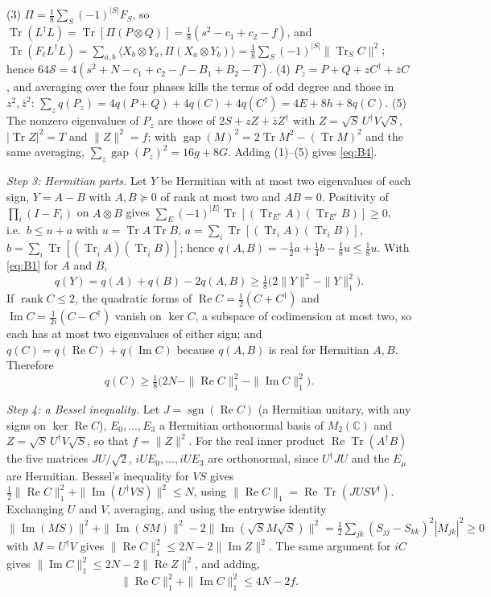 \documentclass[aps,pra,twocolumn,superscriptaddress,nofootinbib,longbibliography]{revtex4-2}
\newcommand{\C}{\mathbb C}
\newcommand{\ip}[2]{\langle #1,#2\rangle}
\DeclareMathOperator{\Tr}{Tr}
\DeclareMathOperator{\rank}{rank}
\theoremstyle{plain}
\theoremstyle{definition}
\theoremstyle{remark}
\begin{document}
(3) $\Pi=\tfrac18\sum_S(-1)^{|S|}F_S$, so $\Tr(L^\dagger L)=\Tr[\Pi(P\otimes Q)]=\tfrac18(s^2-c_1+c_2-f)$, and $\Tr(F_\ell L^\dagger L)=\sum_{a,b}\ip{X_b\otimes Y_a}{\Pi(X_a\otimes Y_b)}=\tfrac18\sum_S(-1)^{|S|}\|\Tr_SC\|^2$; hence $64\mathcal S=4(s^2+N-c_1+c_2-f-B_1+B_2-T)$.
(4) $P_z=P+Q+zC^\dagger+\bar zC$, and averaging over the four phases kills the terms of odd degree and those in $z^2,\bar z^2$: $\sum_zq(P_z)=4q(P+Q)+4q(C)+4q(C^\dagger)=4E+8h+8q(C)$.
(5) The nonzero eigenvalues of $P_z$ are those of $2S+zZ+\bar zZ^\dagger$ with $Z=\sqrt S\,U^\dagger V\sqrt S$, $|\Tr Z|^2=T$ and $\|Z\|^2=f$; with $\operatorname{gap}(M)^2=2\Tr M^2-(\Tr M)^2$ and the same averaging, $\sum_z\operatorname{gap}(P_z)^2=16g+8G$.
Adding (1)--(5) gives \eqref{eq:B4}.

\emph{Step 3: Hermitian parts.} Let $Y$ be Hermitian with at most two eigenvalues of each sign, $Y=A-B$ with $A,B\succeq0$ of rank at most two and $AB=0$. Positivity of $\prod_i(I-F_i)$ on $A\otimes B$ gives $\sum_E(-1)^{|E|}\Tr[(\Tr_{E^c}A)(\Tr_{E^c}B)]\ge0$, i.e.\ $b\le u+a$ with $u=\Tr A\Tr B$, $a=\sum_i\Tr[(\Tr_iA)(\Tr_iB)]$, $b=\sum_i\Tr[(\Tr_{\bar i}A)(\Tr_{\bar i}B)]$; hence $q(A,B)=-\tfrac12a+\tfrac14b-\tfrac18u\le\tfrac18u$. With \eqref{eq:B1} for $A$ and $B$,
\begin{equation}\label{eq:B6}
q(Y)=q(A)+q(B)-2q(A,B)\ge\tfrac18\bigl(2\|Y\|^2-\|Y\|_1^2\bigr).
\end{equation}
If $\rank C\le2$, the quadratic forms of $\operatorname{Re}C=\tfrac12(C+C^\dagger)$ and $\operatorname{Im}C=\tfrac1{2i}(C-C^\dagger)$ vanish on $\ker C$, a subspace of codimension at most two, so each has at most two eigenvalues of either sign; and $q(C)=q(\operatorname{Re}C)+q(\operatorname{Im}C)$ because $q(A,B)$ is real for Hermitian $A,B$. Therefore
\begin{equation}\label{eq:B7}
q(C)\ge\tfrac18\bigl(2N-\|\operatorname{Re}C\|_1^2-\|\operatorname{Im}C\|_1^2\bigr).
\end{equation}

\emph{Step 4: a Bessel inequality.} Let $J=\operatorname{sgn}(\operatorname{Re}C)$ (a Hermitian unitary, with any signs on $\ker\operatorname{Re}C$), $E_0,\dots,E_3$ a Hermitian orthonormal basis of $M_2(\C)$ and $Z=\sqrt S\,U^\dagger V\sqrt S$, so that $f=\|Z\|^2$. For the real inner product $\operatorname{Re}\Tr(A^\dagger B)$ the five matrices $JU/\sqrt2$, $iUE_0,\dots,iUE_3$ are orthonormal, since $U^\dagger JU$ and the $E_\mu$ are Hermitian. Bessel's inequality for $VS$ gives $\tfrac12\|\operatorname{Re}C\|_1^2+\|\operatorname{Im}(U^\dagger VS)\|^2\le N$, using $\|\operatorname{Re}C\|_1=\operatorname{Re}\Tr(JUSV^\dagger)$. Exchanging $U$ and $V$, averaging, and using the entrywise identity $\|\operatorname{Im}(MS)\|^2+\|\operatorname{Im}(SM)\|^2-2\|\operatorname{Im}(\sqrt SM\sqrt S)\|^2=\tfrac12\sum_{jk}(S_{jj}-S_{kk})^2|M_{jk}|^2\ge0$ with $M=U^\dagger V$ gives $\|\operatorname{Re}C\|_1^2\le2N-2\|\operatorname{Im}Z\|^2$. The same argument for $iC$ gives $\|\operatorname{Im}C\|_1^2\le2N-2\|\operatorname{Re}Z\|^2$, and adding,
\begin{equation}\label{eq:B8}
\|\operatorname{Re}C\|_1^2+\|\operatorname{Im}C\|_1^2\le4N-2f .
\end{equation}
\end{document}
